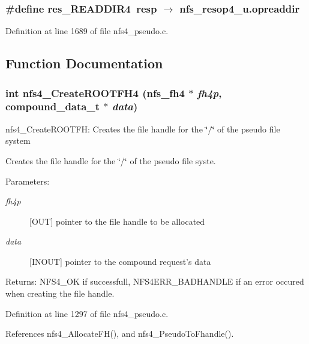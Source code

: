 \subsubsection{\setlength{\rightskip}{0pt plus 5cm}\#define res\_\-READDIR4\ resp $\rightarrow$ nfs\_\-resop4\_\-u.opreaddir}\label{nfs4__pseudo_8c_a12}




Definition at line 1689 of file nfs4\_\-pseudo.c.

\subsection{Function Documentation}
\subsubsection{\setlength{\rightskip}{0pt plus 5cm}int nfs4\_\-Create\-ROOTFH4 (nfs\_\-fh4 $\ast$ {\em fh4p}, compound\_\-data\_\-t $\ast$ {\em data})}\label{nfs4__pseudo_8c_a21}


nfs4\_\-Create\-ROOTFH: Creates the file handle for the \char`\"{}/\char`\"{} of the pseudo file system

Creates the file handle for the \char`\"{}/\char`\"{} of the pseudo file syste.

\begin{Desc}
\item[Parameters:]
\begin{description}
\item[{\em fh4p}][OUT] pointer to the file handle to be allocated \item[{\em data}][INOUT] pointer to the compound request's data\end{description}
\end{Desc}
\begin{Desc}
\item[Returns:]NFS4\_\-OK if successfull, NFS4ERR\_\-BADHANDLE if an error occured when creating the file handle. \end{Desc}


Definition at line 1297 of file nfs4\_\-pseudo.c.

References nfs4\_\-Allocate\-FH(), and nfs4\_\-Pseudo\-To\-Fhandle().
